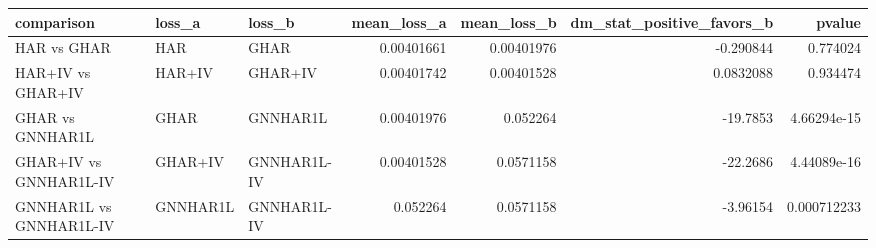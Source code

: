 \begin{tabular}{lllrrrr}
\toprule
comparison & loss_a & loss_b & mean_loss_a & mean_loss_b & dm_stat_positive_favors_b & pvalue \\
\midrule
HAR vs GHAR & HAR & GHAR & 0.00401661 & 0.00401976 & -0.290844 & 0.774024 \\
HAR+IV vs GHAR+IV & HAR+IV & GHAR+IV & 0.00401742 & 0.00401528 & 0.0832088 & 0.934474 \\
GHAR vs GNNHAR1L & GHAR & GNNHAR1L & 0.00401976 & 0.052264 & -19.7853 & 4.66294e-15 \\
GHAR+IV vs GNNHAR1L-IV & GHAR+IV & GNNHAR1L-IV & 0.00401528 & 0.0571158 & -22.2686 & 4.44089e-16 \\
GNNHAR1L vs GNNHAR1L-IV & GNNHAR1L & GNNHAR1L-IV & 0.052264 & 0.0571158 & -3.96154 & 0.000712233 \\
\bottomrule
\end{tabular}
